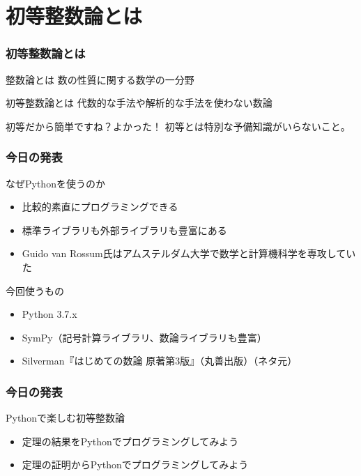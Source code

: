 \documentclass[dvipdfmx,11pt,notheorems]{beamer}
\theoremstyle{definition}
\begin{document}
\section{初等整数論とは}

\begin{frame}\frametitle{初等整数論とは}

\begin{block}{整数論とは}
数の性質に関する数学の一分野
\end{block}

\begin{block}{初等整数論とは}
代数的な手法や解析的な手法を使わない数論
\end{block}

\begin{alertblock}{初等だから簡単ですね？よかった！}
初等とは特別な予備知識がいらないこと。
\end{alertblock}

\end{frame}

\begin{frame}\frametitle{今日の発表}

\begin{block}{なぜPythonを使うのか}
\begin{itemize}
\item 比較的素直にプログラミングできる
\item 標準ライブラリも外部ライブラリも豊富にある
\item Guido van Rossum氏はアムステルダム大学で数学と計算機科学を専攻していた
\end{itemize}
\end{block}

\begin{block}{今回使うもの}
\begin{itemize}
\item Python 3.7.x
\item SymPy（記号計算ライブラリ、数論ライブラリも豊富）
\item Silverman『はじめての数論 原著第3版』（丸善出版）（ネタ元）
\end{itemize}
\end{block}

\end{frame}

\begin{frame}\frametitle{今日の発表}

\begin{block}{Pythonで楽しむ初等整数論}
\begin{itemize}
\item 定理の結果をPythonでプログラミングしてみよう
\item 定理の証明からPythonでプログラミングしてみよう
\end{itemize}
\end{block}

\end{frame}
\end{document}
